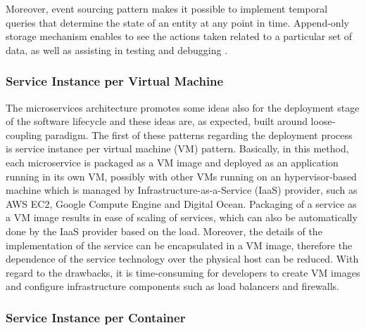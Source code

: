 \documentclass{Configuration_Files/PoliMi3i_thesis}
\begin{document}
Moreover, event sourcing pattern makes it possible to implement temporal queries that determine the state of an entity at any point in time.
Append-only storage mechanism enables to see the actions taken related to a particular set of data, as well as assisting in testing and debugging \cite{event_sourcing_docs}.

\subsubsection{Service Instance per Virtual Machine}
\label{subsubsec:per_vm}

The microservices architecture promotes some ideas also for the deployment stage of the software lifecycle and these ideas are, as expected, built around loose-coupling paradigm.
The first of these patterns regarding the deployment process is service instance per virtual machine (VM) pattern.
Basically, in this method, each microservice is packaged as a VM image and deployed as an application running in its own VM, possibly with other VMs running on an hypervisor-based machine which is managed by Infrastructure-as-a-Service (IaaS) provider, such as AWS EC2, Google Compute Engine and Digital Ocean.
Packaging of a service as a VM image results in ease of scaling of services, which can also be automatically done by the IaaS provider based on the load.
Moreover, the details of the implementation of the service can be encapsulated in a VM image, therefore the dependence of the service technology over the physical host can be reduced.
With regard to the drawbacks, it is time-consuming for developers to create VM images and configure infrastructure components such as load balancers and firewalls.

\subsubsection{Service Instance per Container}
\label{subsubsec:per_container}
\end{document}
